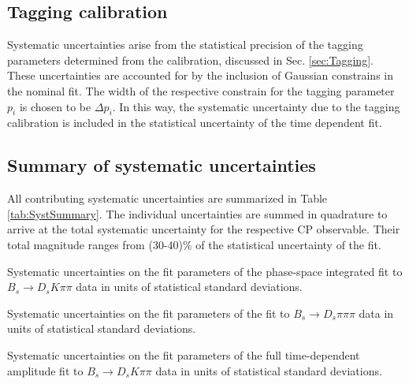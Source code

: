 \subsection{Tagging calibration}

Systematic uncertainties arise from the statistical precision of the tagging parameters determined from the calibration, discussed in Sec. \ref{sec:Tagging}.
These uncertainties are accounted for by the inclusion of Gaussian constrains in the nominal fit. 
The width of the respective constrain for the tagging parameter $p_{i}$  is chosen to be $\Delta p_{i}$. 
In this way, the systematic uncertainty due to the tagging calibration is included in the statistical uncertainty of the time dependent fit.  

\subsection{Summary of systematic uncertainties}

All contributing systematic uncertainties are summarized in Table \ref{tab:SystSummary}. 
The individual uncertainties are summed in quadrature to arrive at the total systematic uncertainty for the respective CP observable.
Their total magnitude ranges from (30-40)$\%$ of the statistical uncertainty of the fit.


\clearpage

\begin{table}[h]
\centering
\caption{Systematic uncertainties on the fit parameters of the phase-space integrated fit to $B_s \to D_s K\pi \pi$ data in units of statistical standard deviations.}
\resizebox{\linewidth}{!}{
	\renewcommand{\arraystretch}{1.5}
	
}
\end{table}

\begin{table}
\centering
\caption{Systematic uncertainties on the fit parameters of the fit to $B_s \to D_s \pi \pi \pi$ data in units of statistical standard deviations.}
\resizebox{0.75\linewidth}{!}{
	\renewcommand{\arraystretch}{1.5}
	
}
\end{table}

\begin{table}
\centering
\caption{Systematic uncertainties on the fit parameters of the full time-dependent amplitude fit to $B_s \to D_s K\pi \pi$ data in units of statistical standard deviations.}
\resizebox{\linewidth}{!}{
	\renewcommand{\arraystretch}{1.5}
	
}
\end{table}

